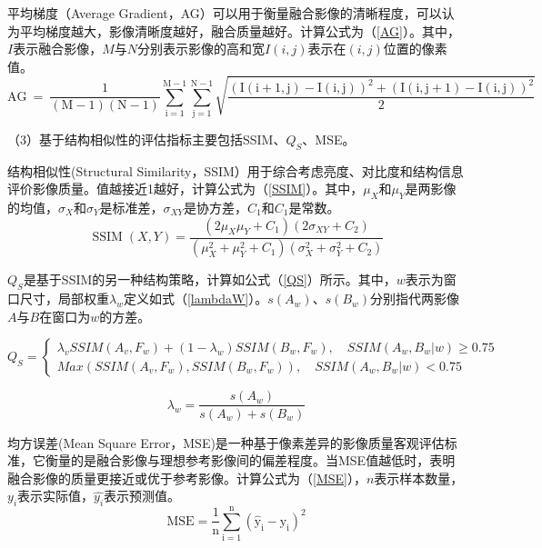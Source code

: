 平均梯度（Average Gradient，AG）可以用于衡量融合影像的清晰程度，可以认为平均梯度越大，影像清晰度越好，融合质量越好\cite{wu2005remote}。计算公式为（\ref{AG}）。其中，$I$表示融合影像，$M$与$N$分别表示影像的高和宽$I(i,j)$表示在$(i,j)$位置的像素值。
\begin{equation}\label{AG}
\mathrm{AG~=~\frac1{(M-1)(N-1)}\sum_{i=1}^{\mathrm{M-1}}\sum_{j=1}^{\mathrm{N-1}}\sqrt{\frac{\left(\mathrm{I}\left(\mathrm{i}+1,\mathrm{j}\right)-\mathrm{I}\left(\mathrm{i},\mathrm{j}\right)\right)^2+\left(\mathrm{I}\left(\mathrm{i},\mathrm{j}+1\right)-\mathrm{I}\left(\mathrm{i},\mathrm{j}\right)\right)^2}2}}
\end{equation}


（3）基于结构相似性的评估指标主要包括SSIM\cite{wang2004image}、$Q_S$\cite{han2013new}、MSE\cite{willmott2005advantages}。

结构相似性(Structural Similarity，SSIM）用于综合考虑亮度、对比度和结构信息评价影像质量\cite{wang2004image}。值越接近1越好，计算公式为（\ref{SSIM}）。其中，$\mu_X$和$\mu_Y$是两影像的均值，$\sigma_{X}$和$\sigma_{Y}$是标准差，$\sigma_{X Y}$是协方差，$C_1$和$C_1$是常数。
\begin{equation}\label{SSIM}
\operatorname{SSIM}(X, Y)=\frac{\left(2 \mu_X \mu_Y+C_1\right)\left(2 \sigma_{X Y}+C_2\right)}{\left(\mu_X^2+\mu_Y^2+C_1\right)\left(\sigma_X^2+\sigma_Y^2+C_2\right)}
\end{equation}


$Q_S$\cite{li2008novel}是基于SSIM的另一种结构策略，计算如公式（\ref{QS}）所示。其中，$w$表示为窗口尺寸，局部权重$\lambda_{w}$定义如式（\ref{lambdaW}）。$s(A_{w})$、$s(B_{w})$分别指代两影像$A$与$B$在窗口为$w$的方差。


\begin{equation}\label{QS}
Q_S=\begin{cases}\lambda_vSSIM(A_v,F_w)+(1-\lambda_w)SSIM(B_w,F_w),\quad SSIM(A_w,B_w|w)\geq0.75\\Max(SSIM(A_v,F_w),SSIM(B_w,F_w)),\quad SSIM(A_w,B_w|w)<0.75\end{cases}
\end{equation}

\begin{equation}\label{lambdaW}
\lambda_{w}=\frac{s(A_{w})}{s(A_{w})+s(B_{w})}
\end{equation}

均方误差(Mean Square Error，MSE)是一种基于像素差异的影像质量客观评估标准，它衡量的是融合影像与理想参考影像间的偏差程度\cite{willmott2005advantages}。当MSE值越低时，表明融合影像的质量更接近或优于参考影像。计算公式为（\ref{MSE}），$n$表示样本数量，$y_i$表示实际值，$\hat{y_i}$表示预测值。
\begin{equation}\label{MSE}
\mathrm M\mathrm S\mathrm E=\frac{1}{\mathrm n}\sum_{\mathrm i=1}^\mathrm{n}\left(\hat{\mathrm y}_\mathrm{i}-\mathrm y_\mathrm{i}\right)^2
\end{equation}

